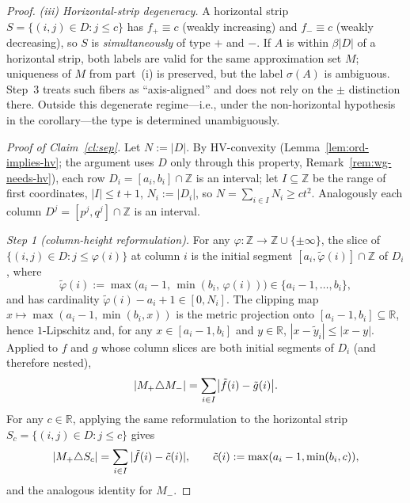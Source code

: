 \begin{proof}
\medskip\noindent\emph{(iii) Horizontal-strip degeneracy.}
A horizontal strip $S=\{(i,j)\in D:j\le c\}$ has $f_+\equiv c$ (weakly increasing) and
$f_-\equiv c$ (weakly decreasing), so $S$ is \emph{simultaneously} of type $+$ and $-$.
If $A$ is within $\beta|D|$ of a horizontal strip, both labels are valid for the same
approximation set $M$; uniqueness of $M$ from part~(i) is preserved, but the label
$\sigma(A)$ is ambiguous. Step~3 treats such fibers as ``axis-aligned'' and does not
rely on the $\pm$ distinction there. Outside this degenerate regime---i.e., under the
non-horizontal hypothesis in the corollary---the type is determined unambiguously.

\medskip\noindent\emph{Proof of Claim~\ref{cl:sep}.}
Let $N:=|D|$. By HV-convexity (Lemma~\ref{lem:ord-implies-hv}; the argument
uses $D$ only through this property, Remark~\ref{rem:wg-needs-hv}), each row
$D_i=[a_i,b_i]\cap\mathbb Z$ is an
interval; let $I\subseteq\mathbb Z$ be the range of first coordinates, $|I|\le t+1$,
$N_i:=|D_i|$, so $N=\sum_{i\in I}N_i\ge ct^2$. Analogously each column
$D^j=[p^j,q^j]\cap\mathbb Z$ is an interval.

\smallskip
\emph{Step 1 (column-height reformulation).}
For any $\varphi\colon\mathbb Z\to\mathbb Z\cup\{\pm\infty\}$, the slice of
$\{(i,j)\in D:j\le\varphi(i)\}$ at column $i$ is the initial segment
$[a_i,\tilde\varphi(i)]\cap\mathbb Z$ of $D_i$, where
\begin{equation}\label{eq:sep-clip}
  \tilde\varphi(i):=\max\bigl(a_i-1,\,\min(b_i,\,\varphi(i))\bigr)\in\{a_i-1,\ldots,b_i\},
\end{equation}
and has cardinality $\tilde\varphi(i)-a_i+1\in[0,N_i]$. The clipping map
$x\mapsto\max(a_i-1,\min(b_i,x))$ is the metric projection onto
$[a_i-1,b_i]\subseteq\mathbb R$, hence $1$-Lipschitz and, for any
$x\in[a_i-1,b_i]$ and $y\in\mathbb R$, $|x-\tilde y_i|\le|x-y|$. Applied to
$f$ and $g$ whose column slices are both initial segments of $D_i$ (and therefore
nested),
\begin{equation}\label{eq:sep-sum}
  |M_+\triangle M_-|=\sum_{i\in I}\bigl|\tilde f(i)-\tilde g(i)\bigr|.
\end{equation}
For any $c\in\mathbb R$, applying the same reformulation to the horizontal strip
$S_c=\{(i,j)\in D:j\le c\}$ gives
\begin{equation}\label{eq:sep-strip}
  |M_+\triangle S_c|=\sum_{i\in I}|\tilde f(i)-\tilde c(i)|,\qquad
  \tilde c(i):=\max(a_i-1,\min(b_i,c)),
\end{equation}
and the analogous identity for $M_-$.


\end{proof}
